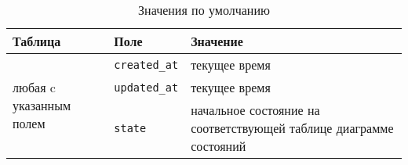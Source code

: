 
\begin{table}[!th]
    \centering
    \caption{Значения по умолчанию}
    \label{tab:db-defaults}
    \begin{tabular}{|p{3cm}|p{3cm}|p{9.5cm}|}
         \hline
         \textbf{Таблица} & \textbf{Поле} & \textbf{Значение} \\
         \hline
         \multirow{3}{3cm}{любая c указанным полем} & \texttt{created\_at} & текущее время \\
         \cline{2-3}
          & \texttt{updated\_at} & текущее время \\
        \cline{2-3}
          & \texttt{state} & начальное состояние на соответствующей таблице диаграмме состояний \\
         \hline
    \end{tabular}
\end{table}

\clearpage

